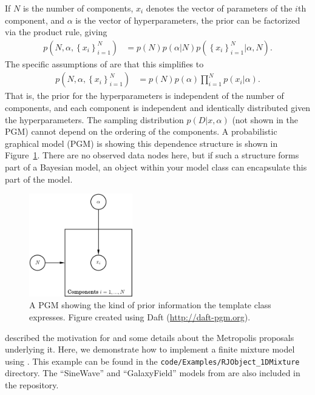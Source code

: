 \documentclass[article, nojss]{jss}
\begin{document}
If $N$ is the number of components, $x_i$ denotes the vector of parameters
of the $i$th component, and $\alpha$ is the vector of hyperparameters, the prior
can be factorized via the product rule, giving
\begin{align}
p\left(N, \alpha, \left\{x_i\right\}_{i=1}^N\right)
&= p(N)p(\alpha | N)p\left(\left\{x_i\right\}_{i=1}^N | \alpha, N\right).
\end{align}
The specific assumptions of  are that this simplifies to
\begin{align}
p\left(N, \alpha, \left\{x_i\right\}_{i=1}^N\right)
&= p(N)p(\alpha)
\prod_{i=1}^N
p\left(x_i | \alpha\right).\label{eqn:rjobject}
\end{align}
That is, the prior for the hyperparameters is independent of the number of
components, and each component is independent and identically
distributed given the hyperparameters. The sampling distribution
$p(D | x, \alpha)$ (not shown in the PGM)
cannot depend on the ordering of the components.
A probabilistic graphical model (PGM) is showing this dependence
structure is shown in Figure~\ref{fig:rjobject_pgm}. There are no observed
data nodes here, but if such a structure forms part of a
Bayesian model, an  object within your model class
can encapsulate this part of the model.

\begin{figure}[ht!]
\begin{center}
\hspace*{-2cm}\includegraphics[width=0.4\textwidth]{figures/rjobject_pgm.pdf}
\caption{A PGM showing the kind of prior information the 
template class expresses.
Figure created using Daft (\url{http://daft-pgm.org}).\label{fig:rjobject_pgm}}
\end{center}
\end{figure}

\citet{brewer2014inference}
described the motivation for  and some details
about the Metropolis proposals underlying it. Here, we demonstrate how to
implement a finite mixture model using .
This example can be found in the
{\tt code/Examples/RJObject\_1DMixture}
directory. The ``SineWave'' and ``GalaxyField'' models
from \citet{brewer2014inference}
are also included in the  repository.
\end{document}

